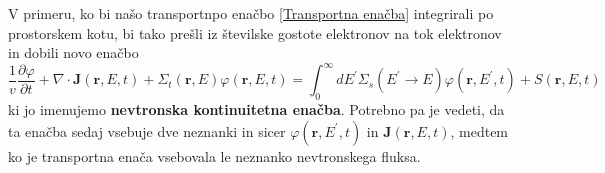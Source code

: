 \documentclass[slovene,11pt,a4paper]{article}
\def\phi{\varphi}
\begin{document}
V primeru, ko bi našo transportnpo enačbo \eqref{Transportna enačba} integrirali po prostorskem kotu, bi tako prešli iz številske gostote elektronov na tok elektronov in dobili novo enačbo \begin{equation}
\frac{1}{v} \frac{\partial \phi}{\partial t}+\nabla \cdot \mathbf{J}(\mathbf{r}, E, t)+\Sigma_{t}(\mathbf{r}, E) \phi(\mathbf{r}, E, t)=\int_{0}^{\infty} d E^{\prime} \Sigma_{s}\left(E^{\prime} \rightarrow E\right) \phi\left(\mathbf{r}, E^{\prime}, t\right)+S(\mathbf{r}, E, t)
\end{equation}
ki jo imenujemo \textbf{nevtronska kontinuitetna enačba}. Potrebno pa je vedeti, da ta enačba sedaj vsebuje dve neznanki in sicer $\phi\left(\mathbf{r}, E^{\prime}, t\right)$ in  $\mathbf{J}(\mathbf{r}, E, t)$, medtem ko je transportna enača vsebovala le neznanko nevtronskega fluksa.  \\
\end{document}
